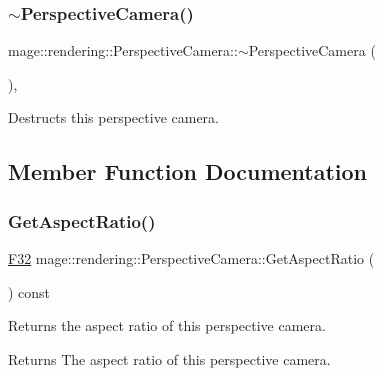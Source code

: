 \subsubsection{\texorpdfstring{$\sim$\+Perspective\+Camera()}{~PerspectiveCamera()}}
{\footnotesize\ttfamily mage\+::rendering\+::\+Perspective\+Camera\+::$\sim$\+Perspective\+Camera (\begin{DoxyParamCaption}{ }\end{DoxyParamCaption})\hspace{0.3cm}{\ttfamily [virtual]}, {\ttfamily [default]}}

Destructs this perspective camera. 

\subsection{Member Function Documentation}
\hypertarget{classmage_1_1rendering_1_1_perspective_camera_a835369a1652074eed3a7d09e01a40430}{}\label{classmage_1_1rendering_1_1_perspective_camera_a835369a1652074eed3a7d09e01a40430} 
\subsubsection{\texorpdfstring{Get\+Aspect\+Ratio()}{GetAspectRatio()}}
{\footnotesize\ttfamily \hyperlink{namespacemage_aa97e833b45f06d60a0a9c4fc22ae02c0}{F32} mage\+::rendering\+::\+Perspective\+Camera\+::\+Get\+Aspect\+Ratio (\begin{DoxyParamCaption}{ }\end{DoxyParamCaption}) const\hspace{0.3cm}{\ttfamily [noexcept]}}

Returns the aspect ratio of this perspective camera.

\begin{DoxyReturn}{Returns}
The aspect ratio of this perspective camera. 
\end{DoxyReturn}
\hypertarget{classmage_1_1rendering_1_1_perspective_camera_af0892905a0030fc70bdc629007cde5a0}{}\label{classmage_1_1rendering_1_1_perspective_camera_af0892905a0030fc70bdc629007cde5a0} 
